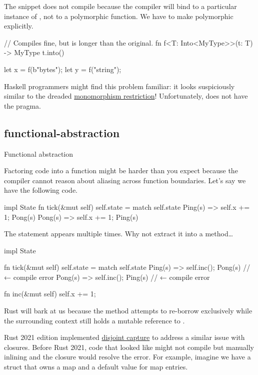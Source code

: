 \documentclass{article}
\begin{document}
The snippet does not compile because the compiler will bind  to a particular instance of , not to a polymorphic function.
We have to make  polymorphic explicitly.

\begin{code}[good]
// Compiles fine, but is longer than the original.
fn f<T: Into<MyType>>(t: T) -> MyType { t.into() }

let x = f(b"bytes");
let y = f("string");
\end{code}

Haskell programmers might find this problem familiar: it looks suspiciously similar to the dreaded \href{https://wiki.haskell.org/Monomorphism_restriction}{monomorphism restriction}!
Unfortunately,  does not have the \href{https://typeclasses.com/ghc/no-monomorphism-restriction}{} pragma.

\subsection{functional-abstraction}{Functional abstraction}

Factoring code into a function might be harder than you expect because the compiler cannot reason about aliasing across function boundaries.
Let's say we have the following code.

\begin{code}[rust]
impl State {
  fn tick(&mut self) {
    self.state = match self.state {
      Ping(s) => { self.x += 1; Pong(s) }
      Pong(s) => { self.x += 1; Ping(s) }
    }
  }
}
\end{code}

The  statement appears multiple times.
Why not extract it into a method\ldots 

\begin{code}[bad]
impl State {
  fn tick(&mut self) {
    self.state = match self.state {
      Ping(s) => { self.inc(); Pong(s) } // ← compile error
      Pong(s) => { self.inc(); Ping(s) } // ← compile error
    }
  }

  fn inc(&mut self) {
    self.x += 1;
  }
}
\end{code}

Rust will bark at us because the method attempts to re-borrow  exclusively while the surrounding context still holds a mutable reference to .

Rust 2021 edition implemented \href{https://doc.rust-lang.org/edition-guide/rust-2021/disjoint-capture-in-closures.html}{disjoint capture} to address a similar issue with closures.
Before Rust 2021, code that looked like  might not compile but manually inlining  and the closure would resolve the error.
For example, imagine we have a struct that owns a map and a default value for map entries.
\end{document}
